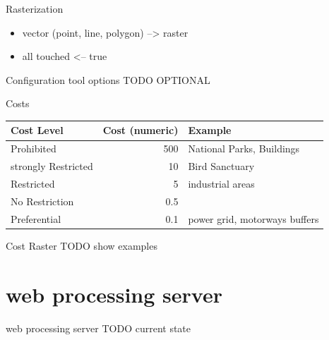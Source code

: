 \documentclass[usenames,dvipsnames,aspectratio=169]{beamer}
\begin{document}
\begin{frame}{Rasterization}
	\begin{itemize}
		\item vector (point, line, polygon) --> raster
		\item all touched <-- true
	\end{itemize}
	\vspace{5.0mm}
\end{frame}

\begin{frame}{Configuration tool options}
	TODO OPTIONAL
\end{frame}

\begin{frame}{Costs}
	
	\vspace{5.0mm}
	
	\begin{tabular}{ l  r  l }
		Cost Level & Cost (numeric) &  Example\\
		\hline
		Prohibited & 500					& National Parks, Buildings \\
		strongly Restricted & 10 	& Bird Sanctuary \\
		Restricted & 5	& industrial areas \\
		No Restriction & 0.5					& \color{green}{default}\\
		Preferential & 0.1					& power grid, motorways buffers\\
	\end{tabular}
\end{frame}

\begin{frame}{Cost Raster}
	TODO show examples
\end{frame}

\section{web processing server}
\begin{frame}{web processing server}
	TODO current state
\end{frame}
\end{document}
